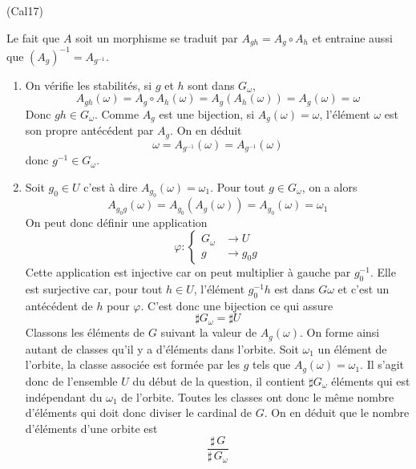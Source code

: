 \begin{tiny}(Cal17)\end{tiny} Le fait que $A$ soit un morphisme se traduit par $A_{gh}=A_g \circ A_h$ et entraine aussi que $(A_g)^{-1}=A_{g^{-1}}$.
\begin{enumerate}
 \item On vérifie les stabilités, si $g$ et $h$ sont dans $G_\omega$,
\begin{displaymath}
 A_{gh}(\omega)=A_g \circ A_h(\omega)=A_g( A_h(\omega))=A_g(\omega)=\omega
\end{displaymath}
Donc $gh\in G_\omega$. Comme $A_g$ est une bijection, si $A_g(\omega)=\omega$, l'élément $\omega$ est son propre antécédent par $A_g$. On en déduit
\begin{displaymath}
 \omega = A_{g^{-1}}(\omega)= A_{g^{-1}}(\omega)
\end{displaymath}
donc $g^{-1}\in G_\omega$.
 \item Soit $g_0\in U$ c'est à dire $A_{g_0}(\omega)=\omega_1$. Pour tout $g\in G_\omega$, on a alors
\begin{displaymath}
 A_{g_0g}(\omega)=A_{g_0}(A_g(\omega))= A_{g_0}(\omega)=\omega_1
\end{displaymath}
On peut donc définir une application
\begin{displaymath}
 \varphi:
\left\lbrace 
\begin{aligned}
 G_\omega &\rightarrow U \\ g &\rightarrow g_0g
\end{aligned}
\right. 
\end{displaymath}
Cette application est injective car on peut multiplier à gauche par $g_0^{-1}$. Elle est surjective car, pour tout $h\in U$, l'élément $g_0^{-1}h$ est dans $G\omega$ et c'est un antécédent de $h$ pour $\varphi$. C'est donc une bijection ce qui assure
\begin{displaymath}
 \sharp G_\omega = \sharp U
\end{displaymath}
Classons les éléments de $G$ suivant la valeur de $A_g(\omega)$. On forme ainsi autant de classes qu'il y a d'éléments dans l'orbite. Soit $\omega_1$ un élément de l'orbite, la classe associée est formée par les $g$ tels que $A_g(\omega)=\omega_1$. Il s'agit donc de l'ensemble $U$ du début de la question, il contient $\sharp G_\omega$ éléments qui est indépendant du $\omega_1$ de l'orbite. Toutes les classes ont donc le même nombre d'éléments qui doit donc diviser le cardinal de $G$. On en déduit que le nombre d'éléments d'une orbite est
\begin{displaymath}
 \frac{\sharp\,G}{\sharp\,G_\omega}
\end{displaymath}


\end{enumerate}
